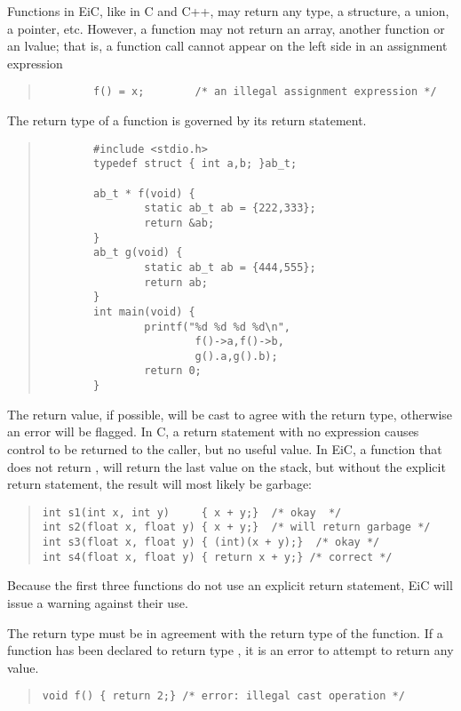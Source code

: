 Functions in EiC, like in C and C++, may return any type, a
structure, a union, a pointer, etc. However, a function may not return
an array, another function or an lvalue; that is, a function call
cannot appear on the left side in an assignment expression

\begin{quote}
\begin{verbatim}
        f() = x;        /* an illegal assignment expression */
\end{verbatim}
\end{quote}

The return type of a function is governed by its return statement. 

\begin{quote}
{\small
\begin{verbatim}
        #include <stdio.h>
        typedef struct { int a,b; }ab_t;

        ab_t * f(void) {
                static ab_t ab = {222,333};
                return &ab;
        }
        ab_t g(void) {
                static ab_t ab = {444,555};
                return ab;
        }
        int main(void) {
                printf("%d %d %d %d\n", 
                        f()->a,f()->b,
                        g().a,g().b);
                return 0;
        }
\end{verbatim}
}
\end{quote}

The return value, if possible, will be cast to agree with the return
type, otherwise an error will be flagged.  In C, a return statement
with no expression causes control to be returned to the caller, but no
useful value. In EiC, a function that does not return , will
return the last value on the stack, but without the explicit return
statement, the result will most likely be garbage:
\begin{quote}
\begin{verbatim}
int s1(int x, int y)     { x + y;}  /* okay  */
int s2(float x, float y) { x + y;}  /* will return garbage */
int s3(float x, float y) { (int)(x + y);}  /* okay */
int s4(float x, float y) { return x + y;} /* correct */
\end{verbatim}
\end{quote}


Because the first three functions do not use an explicit return
statement, EiC will issue a warning against their use.  

The return type must be in agreement with the return type of the
function.  If a function has been declared to return type ,
it is an error to attempt to return any value.
\begin{quote}
\begin{verbatim}
void f() { return 2;} /* error: illegal cast operation */
\end{verbatim}
\end{quote}

